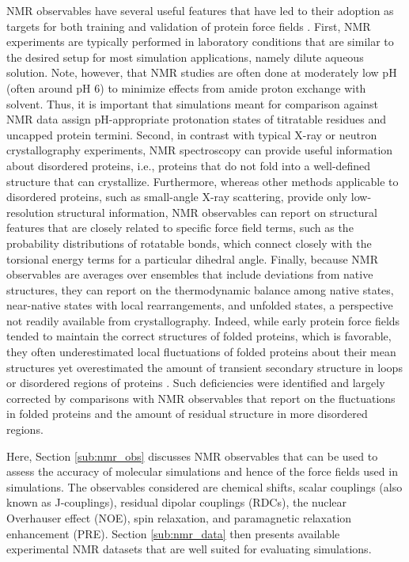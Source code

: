 \documentclass[9pt,review,pubversion]{livecoms}
\begin{document}
NMR observables have several useful features that have led to their adoption as targets for both training and validation of protein force fields \cite{allison_assessing_2012}.
First, NMR experiments are typically performed in laboratory conditions that are similar to the desired setup for most simulation applications, namely dilute aqueous solution.
Note, however, that NMR studies are often done at moderately low pH (often around pH 6) to minimize effects from amide proton exchange with solvent.
Thus, it is important that simulations meant for comparison against NMR data assign pH-appropriate protonation states of titratable residues and uncapped protein termini.
Second, in contrast with typical X-ray or neutron crystallography experiments, NMR spectroscopy can provide useful information about disordered proteins, i.e., proteins that do not fold into a well-defined structure that can crystallize.
Furthermore, whereas other methods applicable to disordered proteins, such as small-angle X-ray scattering, provide only low-resolution structural information, NMR observables can report on structural features that are closely related to specific force field terms, such as the probability distributions of rotatable bonds, which connect closely with the torsional energy terms for a particular dihedral angle.
Finally, because NMR observables are averages over ensembles that include deviations from native structures, they can report on the thermodynamic balance among native states, near-native states with local rearrangements, and unfolded states, a perspective not readily available from crystallography.
Indeed, while early protein force fields tended to maintain the correct structures of folded proteins, which is favorable, they often underestimated local fluctuations of folded proteins about their mean structures yet overestimated the amount of transient secondary structure in loops or disordered regions of proteins \cite{mackerell_jr_extending_2004,hornak_comparison_2006,lindorff-larsen_improved_2010,best_optimization_2012,maier_ff14sb_2015,diem_hamiltonian_2020}.
Such deficiencies were identified and largely corrected by comparisons with NMR observables that report on the fluctuations in folded proteins and the amount of residual structure in more disordered regions.

Here, Section \ref{sub:nmr_obs} discusses NMR observables that can be used to assess the accuracy of molecular simulations and hence of the force fields used in simulations.
The observables considered are chemical shifts, scalar couplings (also known as J-couplings), residual dipolar couplings (RDCs), the nuclear Overhauser effect (NOE), spin relaxation, and paramagnetic relaxation enhancement (PRE).
Section \ref{sub:nmr_data} then presents available experimental NMR datasets that are well suited for evaluating simulations.
\end{document}
